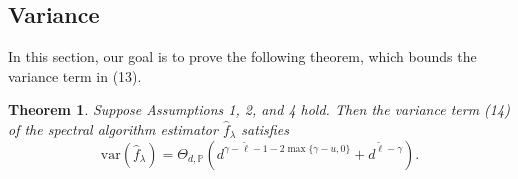 \documentclass{article}
\theoremstyle{plain}
\newtheorem{theorem}{Theorem}[section]
\theoremstyle{definition}
\theoremstyle{remark}
\begin{document}
\begin{appendix}

\section{Variance}\label{append_variance}

In this section, our goal is to prove the following theorem, which bounds the variance term in (13).

\begin{theorem}\label{thm_variance_spe}
    Suppose Assumptions 1, 2, and 4 hold.
    Then the variance term (14) of the spectral algorithm estimator $\hat{f}_{\lambda}$ satisfies
    \begin{displaymath}
        \mathrm{var}(\hat{f}_{\lambda}) = \Theta_{d, \mathbb{P}} \left( 
        d^{\gamma - \tilde{\ell} - 1 - 2  \max\{\gamma - u, 0\}}
+ d^{\tilde{\ell} - \gamma}
        \right).
    \end{displaymath} 
\end{theorem}



\end{appendix}
\end{document}
